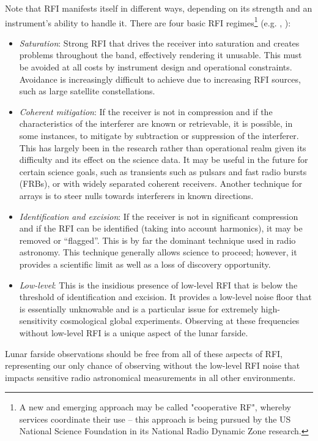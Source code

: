 Note that RFI manifests itself in different ways, depending on its strength and an instrument's ability to handle it.  There are four basic RFI regimes\footnote{A new and emerging approach may be called "cooperative RF", whereby services coordinate their use -- this approach is being pursued by the US National Science Foundation in its National Radio Dynamic Zone research.}
(e.g. \citealt{Ellingson2005}, \citealt{selina2023detrimental}):
\begin{itemize}
    \item {\em Saturation}: Strong RFI that drives the receiver into saturation and creates problems throughout the band, effectively rendering it unusable.  This must be avoided at all costs by instrument design and operational constraints. Avoidance is increasingly difficult to achieve due to increasing RFI sources, such as large satellite constellations.
    \item {\em Coherent mitigation}: If the receiver is not in compression and if the characteristics of the interferer are known or retrievable, it is possible, in some instances, to mitigate by subtraction or suppression of the interferer.  This has largely been in the research rather than operational realm given its difficulty and its effect on the science data.  It may be useful in the future for certain science goals, such as transients such as pulsars and fast radio bursts (FRBs), or with widely separated coherent receivers.  Another technique for arrays is to steer nulls towards interferers in known directions.
    \item {\em Identification and excision}:  If the receiver is not in significant compression and if the RFI can be identified (taking into account harmonics), it may be removed or ``flagged''.  This is by far the dominant technique used in radio astronomy.  This technique generally allows science to proceed; however, it provides a scientific limit as well as a loss of discovery opportunity.
    \item {\em Low-level}:  This is the insidious presence of low-level RFI that is below the threshold of identification and excision.  It provides a low-level noise floor that is essentially unknowable and is a particular issue for extremely high-sensitivity cosmological global experiments. Observing at these frequencies without low-level RFI is a unique aspect of the lunar farside.
\end{itemize}
Lunar farside observations should be free from all of these aspects of RFI, representing our only chance of observing without the low-level RFI noise that impacts sensitive radio astronomical measurements in all other environments.


